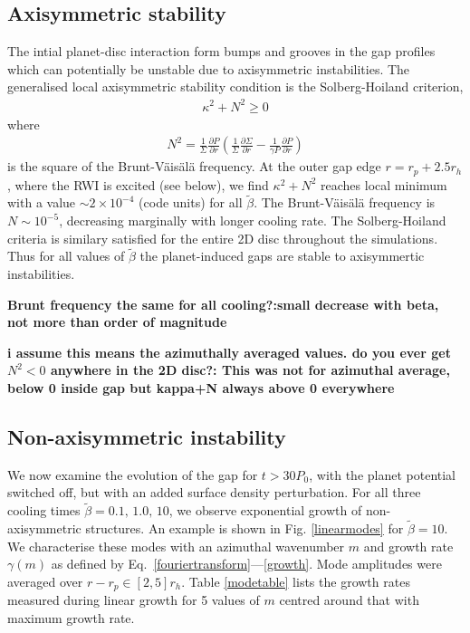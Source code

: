 \subsection{Axisymmetric stability}
The intial planet-disc interaction form bumps and grooves in the gap profiles
which can potentially be unstable due to axisymmetric instabilities. The
generalised local axisymmetric stability condition is the Solberg-Hoiland
criterion,  
\begin{align}
  \kappa^2+N^2 \geq 0 
\end{align}
where
\begin{align}
 N^2=\frac{1}{\Sigma} \frac{\partial P}{\partial r}
 \left(\frac{1}{\Sigma} \frac{\partial \Sigma}{\partial
     r}-\frac{1}{\gamma P} \frac{\partial P}{\partial r}  \right) 
\end{align}
is the square of the Brunt-V\"ais\"al\"a frequency. 
At the outer gap edge $r=r_p+2.5r_h$,  where the RWI is excited
(see below), we find $\kappa^2 + N^2$ reaches local minimum with a value
$\sim 2\times10^{-4}$ (code units) for all $\tilde\beta$. The
Brunt-V\"ais\"al\"a frequency is $N\sim 10^{-5}$, decreasing marginally with longer cooling rate. 
The Solberg-Hoiland criteria is similary satisfied for the entire 2D disc throughout the 
simulations.
Thus for all values of $\tilde\beta$ the planet-induced gaps are
stable to axisymmertic instabilities. 

{\bf Brunt frequency the same for all cooling?:small decrease with beta,
 not more than order of magnitude}

 {\bf i assume this means the azimuthally averaged
  values. do you ever get $N^2<0$ anywhere in the 2D disc?:
 This was not for azimuthal average, below 0 inside gap but kappa+N always above 0 everywhere} 

\subsection{Non-axisymmetric instability}\label{linear}
We now examine the evolution of the gap for $t>30P_0$, with the
planet potential switched off, but with an added surface density
perturbation. For all three cooling times $\tilde{\beta}=0.1,\, 1.0,\,
10$, we observe exponential growth of non-axisymmetric
structures. An example is shown in Fig. \ref{linearmodes} for 
$\tilde{\beta}=10$. We characterise these
modes with an azimuthal wavenumber $m$ and growth rate $\gamma(m)$ as defined by
Eq.~\ref{fouriertransform}---\ref{growth}. Mode amplitudes were
averaged over $r-r_p\in[2,5]r_h$. Table \ref{modetable}
lists the growth rates measured during 
linear growth for 5 values of $m$ centred around that with maximum
growth rate. 

